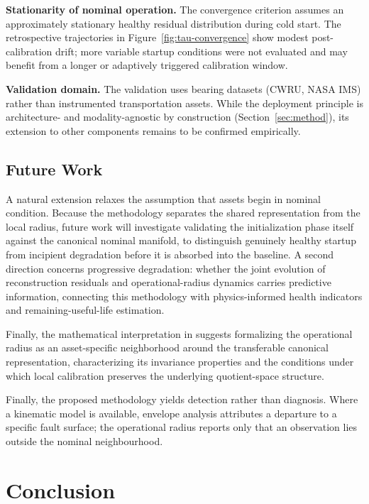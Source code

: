 \documentclass[numbered]{trbunofficial}
\begin{document}
\textbf{Stationarity of nominal operation.} The convergence criterion assumes an approximately
stationary healthy residual distribution during cold start. The retrospective trajectories in
Figure~\ref{fig:tau-convergence} show modest post-calibration drift; more variable startup
conditions were not evaluated and may benefit from a longer or adaptively triggered calibration
window.

\textbf{Validation domain.} The validation uses bearing datasets (CWRU, NASA IMS) rather than
instrumented transportation assets. While the deployment principle is architecture- and
modality-agnostic by construction (Section~\ref{sec:method}), its extension to other components
remains to be confirmed empirically.



\subsection{Future Work}

A natural extension relaxes the assumption that assets begin in nominal condition. Because the
methodology separates the shared representation from the local radius, future work will
investigate validating the initialization phase itself against the canonical nominal manifold, to
distinguish genuinely healthy startup from incipient degradation before it is absorbed into the
baseline. A second direction concerns progressive degradation: whether the joint evolution of
reconstruction residuals and operational-radius dynamics carries predictive information,
connecting this methodology with physics-informed health indicators and remaining-useful-life
estimation.

Finally, the mathematical interpretation in \citep{disanti2026quotient} suggests formalizing the
operational radius as an asset-specific neighborhood around the transferable canonical
representation, characterizing its invariance properties and the conditions under which local
calibration preserves the underlying quotient-space structure.

Finally, the proposed methodology yields detection rather than diagnosis.
Where a kinematic model is available, envelope analysis attributes a
departure to a specific fault surface; the operational radius reports only
that an observation lies outside the nominal neighbourhood.


\section{Conclusion}
\end{document}

